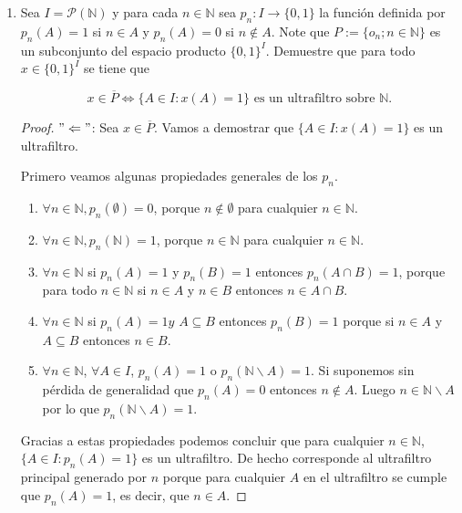 \documentclass[letter,twoside,12pt]{article}
\begin{document}
\begin{enumerate}
\item Sea $ I=\mathcal{P}(\mathbb{N}) $ y para cada $ n \in \mathbb{N} $ sea $ p_n:I \to \{0,1\} $ la función definida por $ p_n(A)=1 $ si $ n \in A $ y $ p_n(A)=0 $ si $ n \not  \in A $. Note que $ P:=\{ o_n; n \in \mathbb{N}\} $ es un subconjunto del espacio producto $ \{0,1\}^I $. Demuestre que para todo $ x \in \{0,1\}^I $ se tiene que

\begin{equation}
x \in \overline{P} \Leftrightarrow \{A \in I: x(A)=1\} \text{ es un ultrafiltro sobre } \mathbb{N}. \nonumber
\end{equation}

\begin{proof}
$ "\Leftarrow" $: Sea $ x \in  \overline{P} $. Vamos a demostrar que $ \{A \in I: x(A)=1\} $ es un ultrafiltro.

Primero veamos algunas propiedades generales de los $ p_n $.

\begin{enumerate}
\item $ \forall n \in \mathbb{N}, p_n(\emptyset)=0 $, porque $ n \not \in \emptyset $ para cualquier $ n \in \mathbb{N} $.

\item $ \forall n \in \mathbb{N}, p_n(\mathbb{N})=1 $, porque $ n \in \mathbb{N} $ para cualquier $ n \in \mathbb{N} $.

\item $ \forall n \in \mathbb{N}$ si $ p_n(A)=1 $ y  $ p_n(B)=1  $ entonces  $  p_n(A \cap B)=1 $, porque para todo $ n \in \mathbb{N} $ si $ n \in A $ y $ n \in B $ entonces $ n \in A \cap B $.

\item $ \forall n \in \mathbb{N} $ si $ p_n(A)=1 y $ $ A \subseteq B $ entonces $ p_n(B) =1 $ porque si $ n \in A $ y $ A \subseteq B $ entonces $ n \in B $.

\item $ \forall n \in \mathbb{N} $, $ \forall A \in I $, $ p_n(A)=1 $ o $ p_n(\mathbb{N} \backslash A) = 1 $. Si suponemos sin pérdida de generalidad que $ p_n(A)= 0 $ entonces $ n \not \in A $. Luego $ n \in \mathbb{N} \backslash A $ por lo que $ p_n(\mathbb{N} \backslash A) = 1 $. 
\end{enumerate}

Gracias a estas propiedades podemos concluir que para cualquier $ n \in \mathbb{N}$, $ \{A \in I: p_n(A)=1\} $ es un ultrafiltro. De hecho corresponde al ultrafiltro principal generado por $ n $ porque para cualquier $ A $ en el ultrafiltro se cumple que $ p_n(A)=1 $, es decir, que $ n \in A $.


\end{proof}
\end{enumerate}
\end{document}
